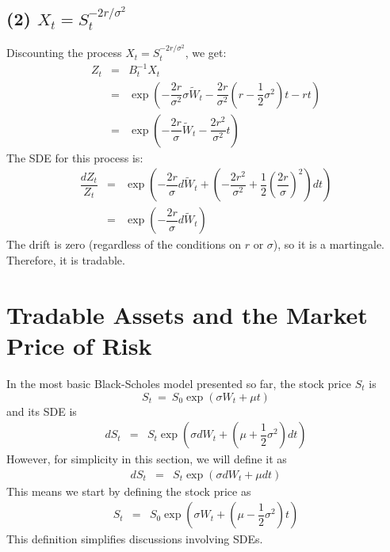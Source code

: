 \documentclass[uplatex,a4j,12pt,dvipdfmx]{jsarticle}
\begin{document}
\subsection{(2) $X_{t} = S^{-2r/\sigma^{2}}_{t}$}

Discounting the process $X_{t} = S^{-2r/\sigma^{2}}_{t}$, we get:
%
%
\begin{eqnarray*}
	Z_{t}
	&=&
	B^{-1}_{t} X_{t}
	\\ &=&
	\exp \left(
	-\dfrac{2r}{\sigma^{2}}
	\sigma \tilde{W}_{t}
	-\dfrac{2r}{\sigma^{2}}
	\left(
	r - \dfrac{1}{2} \sigma^{2}
	\right)
	t
	-rt
	\right)
	\\ &=&
	\exp \left(
	-\dfrac{2r}{\sigma}
	\tilde{W}_{t}
	-
	\dfrac{2r^{2}}{\sigma^{2}}
	t
	\right)
\end{eqnarray*}
%
%
The SDE for this process is:
%
%
\begin{eqnarray*}
	\dfrac{dZ_{t}}{Z_{t}}
	&=&
	\exp \left(
	-\dfrac{2r}{\sigma}
	d \tilde{W}_{t}
	+
	\left(
		-
		\dfrac{2r^{2}}{\sigma^{2}}
		+
		\dfrac{1}{2}
		\left( \dfrac{2r}{\sigma} \right)^{2}
		\right)
	d t
	\right)
	\\ &=&
	\exp \left(
	-\dfrac{2r}{\sigma}
	d \tilde{W}_{t}
	\right)
\end{eqnarray*}
%
%
The drift is zero (regardless of the conditions on $r$ or $\sigma$), so it is a martingale. Therefore, it is tradable.

\section{Tradable Assets and the Market Price of Risk}

In the most basic Black-Scholes model presented so far, the stock price $S_{t}$ is
$$
	S_{t}
	\ = \
	S_{0} \exp ( \sigma W_{t} + \mu t )
$$
and its SDE is
%
%
\begin{eqnarray*}
	d S_{t}
	&=&
	S_{t} \exp \left( \sigma dW_{t} + \left( \mu + \dfrac{1}{2} \sigma^{2} \right) dt \right)
\end{eqnarray*}
%
%
However, for simplicity in this section, we will define it as
%
%
\begin{eqnarray*}
	d S_{t}
	&=&
	S_{t} \exp \left( \sigma dW_{t} + \mu dt \right)
\end{eqnarray*}
%
%
This means we start by defining the stock price as
%
%
\begin{eqnarray*}
	S_{t}
	&=&
	S_{0} \exp \left( \sigma W_{t} + \left( \mu - \dfrac{1}{2} \sigma^{2} \right) t \right)
\end{eqnarray*}
%
%
This definition simplifies discussions involving SDEs.
\end{document}
